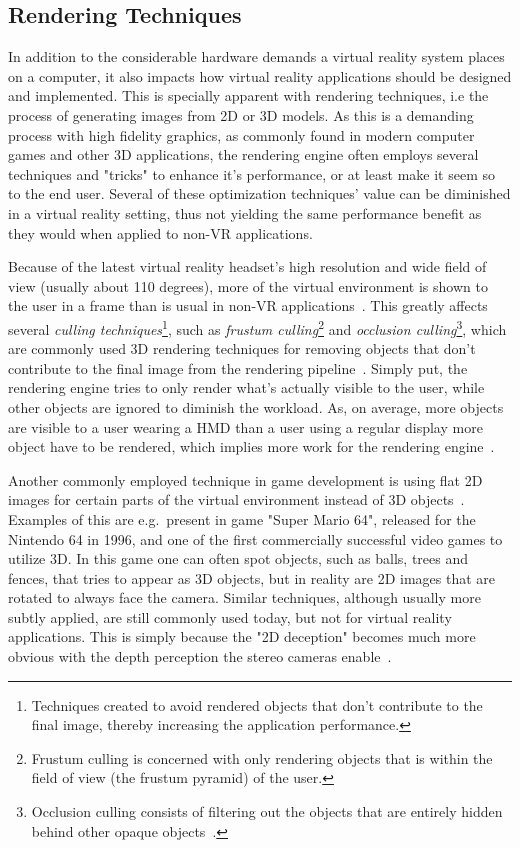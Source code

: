 \subsection{Rendering Techniques}
In addition to the considerable hardware demands a virtual reality system places on a computer, it also impacts how virtual reality applications should be designed and implemented. 
This is specially apparent with rendering techniques, i.e the process of generating images from 2D or 3D models. 
As this is a demanding process with high fidelity graphics, as commonly found in modern computer games and other 3D applications, the rendering engine often employs several 
techniques and "tricks" to enhance it's performance, or at least make it seem so to the end user.
Several of these optimization techniques' value can be diminished in a virtual reality setting, thus not yielding the 
same performance benefit as they would when applied to non-VR applications.

Because of the latest virtual reality headset's high resolution and wide field of view (usually about 110 degrees), 
more of the virtual environment is shown to the user in a frame than is usual in non-VR applications~\citep{Ohannessian2016}. 
This greatly affects several \textit{culling techniques}\footnote{Techniques created to avoid rendered objects that don't contribute to the final image, thereby increasing the application performance.}, such as 
\textit{frustum culling}\footnote{Frustum culling is concerned with only rendering objects that is within the field of view (the frustum pyramid) of the user.} and 
\textit{occlusion culling}\footnote{Occlusion culling consists of filtering out the objects that are entirely hidden behind other opaque objects~\citep{PerezFernandez2015}.}, 
which are commonly used 3D rendering techniques for removing objects that don't contribute to the final image from the rendering pipeline~\citep{Johnson2013}.
Simply put, the rendering engine tries to only render what's actually visible to the user, while other objects are ignored to diminish the workload. 
As, on average, more objects are visible to a user wearing a HMD than a user using a regular display more object have to be rendered, which implies more work for the rendering
engine~\citep{Ohannessian2016}. 

Another commonly employed technique in game development is using flat 2D images for certain parts of the virtual environment instead of 3D objects~\citep{Ohannessian2016}.
Examples of this are e.g.~present in game "Super Mario 64", released for the Nintendo 64 in 1996, and one of the first commercially successful video games to utilize 3D.
In this game one can often spot objects, such as balls, trees and fences, that tries to appear as 3D objects, but in reality are 2D images that are rotated to always face the camera. 
Similar techniques, although usually more subtly applied, are still commonly used today, but not for virtual reality applications.
This is simply because the "2D deception" becomes much more obvious with the depth perception the stereo cameras enable~\citep{Ohannessian2016}. 


